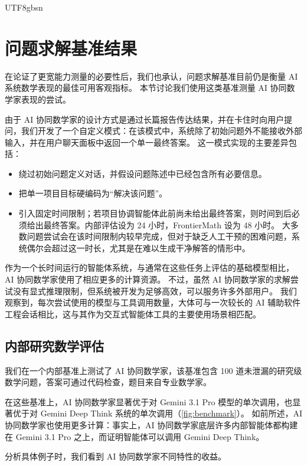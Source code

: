 \documentclass[11pt, a4paper, copyright, gdm]{google}
\begin{document}
\begin{CJK*}{UTF8}{gbsn}
\section{问题求解基准结果}
\label{sec:benchmarks}

在论证了更宽能力测量的必要性后，我们也承认，问题求解基准目前仍是衡量 AI 系统数学表现的最佳可用客观指标。
本节讨论我们使用这类基准测量 AI 协同数学家表现的尝试。

由于 AI 协同数学家的设计方式是通过长篇报告传达结果，并在卡住时向用户提问，我们开发了一个自定义模式：在该模式中，系统除了初始问题外不能接收外部输入，并在用户聊天面板中返回一个单一最终答案。
这一模式实现的主要差异包括：
\begin{itemize}
    \item 绕过初始问题定义对话，并假设问题陈述中已经包含所有必要信息。
    \item 把单一项目目标硬编码为“解决该问题”。
    \item 
    \begin{minipage}[t]{\linewidth}
    引入固定时间限制；若项目协调智能体此前尚未给出最终答案，则时间到后必须给出最终答案。内部评估设为 24 小时，FrontierMath 设为 48 小时。
    大多数问题尝试会在该时间限制内较早完成，但对于缺乏人工干预的困难问题，系统偶尔会超过这一时长，尤其是在难以生成干净解答的情形中。
    \end{minipage}
\end{itemize}

作为一个长时间运行的智能体系统，与通常在这些任务上评估的基础模型相比，AI 协同数学家使用了相应更多的计算资源。
不过，虽然 AI 协同数学家的求解尝试没有显式推理限制，但系统被开发为足够高效，可以服务许多外部用户。
我们观察到，每次尝试使用的模型与工具调用数量，大体可与一次较长的 AI 辅助软件工程会话相比，这与其作为交互式智能体工具的主要使用场景相匹配。

\subsection{内部研究数学评估}

我们在一个内部基准上测试了 AI 协同数学家，该基准包含 100 道未泄漏的研究级数学问题，答案可通过代码检查，题目来自专业数学家。

在这些基准上，AI 协同数学家显著优于对 Gemini 3.1 Pro 模型的单次调用，也显著优于对 Gemini Deep Think 系统的单次调用（\cref{fig:benchmark}）。
如前所述，AI 协同数学家也使用更多计算：事实上，AI 协同数学家底层许多内部智能体都构建在 Gemini 3.1 Pro 之上，而证明智能体可以调用 Gemini Deep Think。

分析具体例子时，我们看到 AI 协同数学家不同特性的收益。


\end{CJK*}
\end{document}

